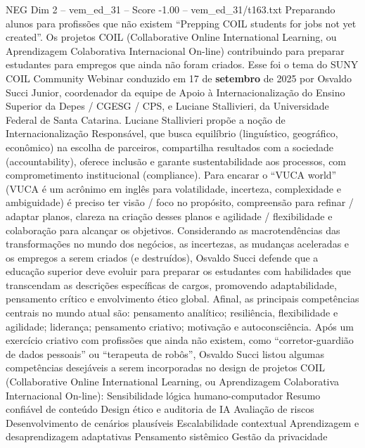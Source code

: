 \begin{textsample}{NEG Dim 2 – vem\_ed\_31 – Score -1.00 – vem\_ed\_31/t163.txt}  \label{ex:f2_neg_007}
Preparando alunos para profissões que não existem “Prepping COIL students for jobs not yet created”.
Os projetos COIL (Collaborative Online International Learning, ou Aprendizagem Colaborativa Internacional On-line) contribuindo para preparar estudantes para empregos que ainda não foram criados.
Esse foi o tema do SUNY COIL Community Webinar conduzido em 17 de \textbf{setembro} de 2025 por Osvaldo Succi Junior, coordenador da equipe de Apoio à Internacionalização do Ensino Superior da Depes / CGESG / CPS, e Luciane Stallivieri, da Universidade Federal de Santa Catarina.
Luciane Stallivieri propõe a noção de Internacionalização Responsável, que busca equilíbrio (linguístico, geográfico, econômico) na escolha de parceiros, compartilha resultados com a sociedade (accountability), oferece inclusão e garante sustentabilidade aos processos, com comprometimento institucional (compliance).
Para encarar o “VUCA world” (VUCA é um acrônimo em inglês para volatilidade, incerteza, complexidade e ambiguidade) é preciso ter visão / foco no propósito, compreensão para refinar / adaptar planos, clareza na criação desses planos e agilidade / flexibilidade e colaboração para alcançar os objetivos.
Considerando as macrotendências das transformações no mundo dos negócios, as incertezas, as mudanças aceleradas e os empregos a serem criados (e destruídos), Osvaldo Succi defende que a educação superior deve evoluir para preparar os estudantes com habilidades que transcendam as descrições específicas de cargos, promovendo adaptabilidade, pensamento crítico e envolvimento ético global.
Afinal, as principais competências centrais no mundo atual são: pensamento analítico; resiliência, flexibilidade e agilidade; liderança; pensamento criativo; motivação e autoconsciência.
Após um exercício criativo com profissões que ainda não existem, como “corretor-guardião de dados pessoais” ou “terapeuta de robôs”, Osvaldo Succi listou algumas competências desejáveis a serem incorporadas no design de projetos COIL (Collaborative Online International Learning, ou Aprendizagem Colaborativa Internacional On-line): Sensibilidade lógica humano-computador Resumo confiável de conteúdo Design ético e auditoria de IA Avaliação de riscos Desenvolvimento de cenários plausíveis Escalabilidade contextual Aprendizagem e desaprendizagem adaptativas Pensamento sistêmico Gestão da privacidade

\end{textsample}
